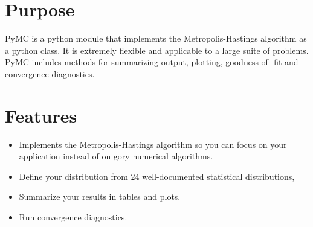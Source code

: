 





\hypertarget{purpose}{}
\section*{Purpose}

PyMC is a python module that implements the Metropolis-Hastings algorithm as a
python class. It is extremely flexible and applicable to a large suite of
problems. PyMC includes methods for summarizing output, plotting, goodness-of-
fit and convergence diagnostics.



\hypertarget{features}{}
\section*{Features}
\begin{itemize}
\item {} 
Implements the Metropolis-Hastings algorithm so you can focus on your
application instead of on gory numerical algorithms.

\item {} 
Define your distribution from 24 well-documented statistical distributions,

\item {} 
Summarize your results in tables and plots.

\item {} 
Run convergence diagnostics.

\end{itemize}



\hypertarget{what-s-new-in-2-0}{}
